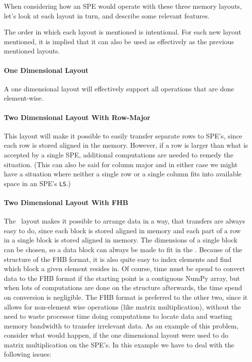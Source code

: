 When considering how an SPE would operate with these three memory layouts, let's look at each layout in turn, and describe some relevant features.

The order in which each layout is mentioned is intentional. For each new layout mentioned, it is implied that it can also be used as effectively
as the previous mentioned layouts.

\paragraph{One Dimensional Layout}
A one dimensional layout will effectively support all operations that are done element-wise.

\paragraph{Two Dimensional Layout With Row-Major}
This layout will make it possible to easily transfer separate rows to SPE's, since each row is stored aligned in the memory.
However, if a row is larger than what is accepted by a single SPE, additional computations are needed to remedy the situation.
(This can also be said for column major and in either case we might have a situation where neither a single row or a single column
fits into available space in an SPE's \texttt{LS}.)

\paragraph{Two Dimensional Layout With FHB}

The \FHB\ layout makes it possible to arrange data in a way, that
transfers are always easy to do, since each block is stored aligned in
memory and each part of a row in a single block is stored aligned in
memory. The dimensions of a single block can be chosen, so a data
block can always be made to fit in the \LS{}. Because of the structure
of the FHB format, it is also quite easy to index elements and find
which block a given element resides in. Of course, time must be spend
to convert data to the FHB format if the starting point is a
contiguous NumPy array, but when lots of computations are done on the
structure afterwards, the time spend on conversion is negligible. The
FHB format is preferred to the other two, since it allows for
non-element wise operations (like matrix multiplication), without the
need to waste processor time doing computations to locate data and
wasting memory bandwidth to transfer irrelevant data. As an example of
this problem, consider what would happen, if the one dimensional
layout were used to do matrix multiplication on the SPE's. In this
example we have to deal with the following issues:

